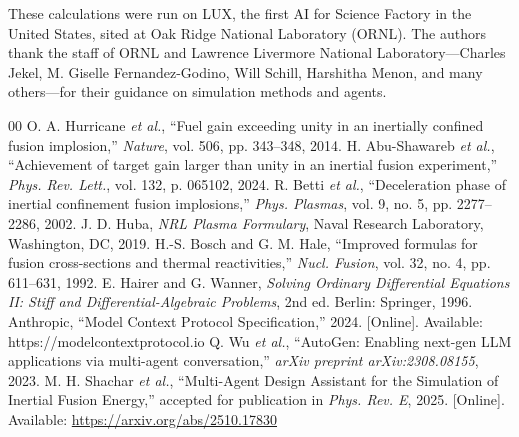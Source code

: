 \documentclass[conference]{IEEEtran}
\begin{document}
These calculations were run on LUX, the first AI for Science Factory in the United States, sited at Oak Ridge National Laboratory (ORNL).  The authors thank the staff of ORNL and Lawrence Livermore National Laboratory---Charles Jekel, M. Giselle Fernandez-Godino, Will Schill, Harshitha Menon, and many others---for their guidance on simulation methods and agents.

\begin{thebibliography}{00}
 O. A. Hurricane \textit{et al.}, ``Fuel gain exceeding unity in an inertially confined fusion implosion,'' \textit{Nature}, vol. 506, pp. 343--348, 2014.
 H. Abu-Shawareb \textit{et al.}, ``Achievement of target gain larger than unity in an inertial fusion experiment,'' \textit{Phys. Rev. Lett.}, vol. 132, p. 065102, 2024.
 R. Betti \textit{et al.}, ``Deceleration phase of inertial confinement fusion implosions,'' \textit{Phys. Plasmas}, vol. 9, no. 5, pp. 2277--2286, 2002.
 J. D. Huba, \textit{NRL Plasma Formulary}, Naval Research Laboratory, Washington, DC, 2019.
 H.-S. Bosch and G. M. Hale, ``Improved formulas for fusion cross-sections and thermal reactivities,'' \textit{Nucl. Fusion}, vol. 32, no. 4, pp. 611--631, 1992.
 E. Hairer and G. Wanner, \textit{Solving Ordinary Differential Equations II: Stiff and Differential-Algebraic Problems}, 2nd ed. Berlin: Springer, 1996.
 Anthropic, ``Model Context Protocol Specification,'' 2024. [Online]. Available: https://modelcontextprotocol.io
 Q. Wu \textit{et al.}, ``AutoGen: Enabling next-gen LLM applications via multi-agent conversation,'' \textit{arXiv preprint arXiv:2308.08155}, 2023.
 M. H. Shachar \textit{et al.}, ``Multi-Agent Design Assistant for the Simulation of Inertial Fusion Energy,'' accepted for publication in \textit{Phys. Rev. E}, 2025. [Online]. Available: \url{https://arxiv.org/abs/2510.17830}
\end{thebibliography}
\end{document}
